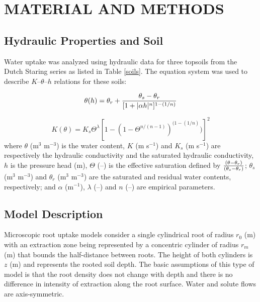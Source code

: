 \def\clim{$C_{lim}$}
\def\c2{$C_2$}
\def\uwc{(m$^3$ m$^{-3}$) }
\def\uhead{(m) }

\section*{MATERIAL AND METHODS}

\subsection*{Hydraulic Properties and Soil}

Water uptake was analyzed using hydraulic data for three topsoils from the Dutch Staring series \citep{wosten} as listed in Table \ref{soils}.
The \cite{genuchten80} equation system was used to describe $K$--$\theta$--$h$ relations for these soils:

\begin{equation}
\label{eq_theta}
\theta(h) = \theta_r + {\theta_s-\theta_r \over [1+|\alpha h|^n]^{1-(1/n)}}
\end{equation}

\begin{equation}
\label{eq_K}
K(\theta) = K_{s} \Theta^\lambda [1-(1-\Theta^{n/(n-1)})^{(1-(1/n)})]^2 
\end{equation}
%
where $\theta$ \uwc is the water content, $K$ (m s$^{-1}$) and $K_s$ (m s$^{-1}$) are respectively the hydraulic conductivity and the saturated hydraulic conductivity, $h$ is the pressure head (m), $\Theta$ (--) is the effective saturation defined by ${(\theta - \theta_r) \over (\theta_s-\theta_r)}$; $\theta_s$ \uwc and $\theta_r$ \uwc are the saturated and residual water contents, respectively; and $\alpha$ (m$^{-1}$), $\lambda$ (--) and $n$ (--) are empirical parameters.





\subsection*{Model Description}

Microscopic root uptake models consider a single cylindrical root of radius $r_0$ \uhead with an extraction zone being represented by a concentric cylinder of radius $r_m$ (m) that bounds the half-distance between roots. The height of both cylinders is $z$ \uhead and represents the rooted soil depth. 
The basic assumptions of this type of model is that the root density does not change with depth and there is no difference in intensity of extraction along the root surface. 
Water and solute flows are axis-symmetric.

